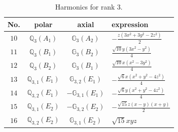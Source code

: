 \documentclass[fleqn,8pt,landscape]{jsarticle}
\begin{document}
\begin{table}[ht!]
\begin{center}
\caption{Harmonics for rank 3.}
\renewcommand{\arraystretch}{1.3}
\begin{tabular}{cccl} \hline \hline
No. & polar & axial & expression \\ \hline
$ 10 $ & $ \mathbb{Q}_{3}(A_{1}) $ & $ \mathbb{G}_{3}(A_{2}) $ & $ - \frac{z \left(3 x^{2} + 3 y^{2} - 2 z^{2}\right)}{2} $ \\
$ 11 $ & $ \mathbb{Q}_{3}(B_{1}) $ & $ \mathbb{G}_{3}(B_{2}) $ & $ \frac{\sqrt{10} y \left(3 x^{2} - y^{2}\right)}{4} $ \\
$ 12 $ & $ \mathbb{Q}_{3}(B_{2}) $ & $ \mathbb{G}_{3}(B_{1}) $ & $ \frac{\sqrt{10} x \left(x^{2} - 3 y^{2}\right)}{4} $ \\
$ 13 $ & $ \mathbb{Q}_{3,1}(E_{1}) $ & $ \mathbb{G}_{3,2}(E_{1}) $ & $ - \frac{\sqrt{6} x \left(x^{2} + y^{2} - 4 z^{2}\right)}{4} $ \\
$ 14 $ & $ \mathbb{Q}_{3,2}(E_{1}) $ & $ -\mathbb{G}_{3,1}(E_{1}) $ & $ - \frac{\sqrt{6} y \left(x^{2} + y^{2} - 4 z^{2}\right)}{4} $ \\
$ 15 $ & $ \mathbb{Q}_{3,1}(E_{2}) $ & $ -\mathbb{G}_{3,2}(E_{2}) $ & $ - \frac{\sqrt{15} z \left(x - y\right) \left(x + y\right)}{2} $ \\
$ 16 $ & $ \mathbb{Q}_{3,2}(E_{2}) $ & $ \mathbb{G}_{3,1}(E_{2}) $ & $ \sqrt{15} x y z $ \\
 \hline \hline
\end{tabular}
\end{center}
\end{table}
\end{document}
